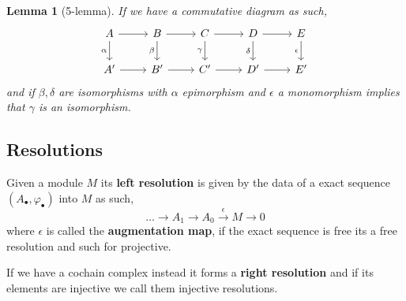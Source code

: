 \documentclass[12pt]{article}
\numberwithin{equation}{section}
\newcounter{dummy} \numberwithin{dummy}{section}
\newtheorem{lemma}[dummy]{Lemma}
\begin{document}
	\begin{lemma}[5-lemma]
		If we have a commutative diagram as such,
		\[\begin{tikzcd}
			A & B & C & D & E \\
			{A'} & {B'} & {C'} & {D'} & {E'}
			\arrow[from=1-1, to=1-2]
			\arrow["\alpha"', from=1-1, to=2-1]
			\arrow[from=1-2, to=1-3]
			\arrow["\beta"', from=1-2, to=2-2]
			\arrow[from=1-3, to=1-4]
			\arrow["\gamma"', from=1-3, to=2-3]
			\arrow[from=1-4, to=1-5]
			\arrow["\delta"', from=1-4, to=2-4]
			\arrow["\epsilon"', from=1-5, to=2-5]
			\arrow[from=2-1, to=2-2]
			\arrow[from=2-2, to=2-3]
			\arrow[from=2-3, to=2-4]
			\arrow[from=2-4, to=2-5]
		\end{tikzcd}\]
		and if $\beta, \delta $ are isomorphisms with $\alpha $ epimorphism and $\epsilon $ a monomorphism implies that $\gamma $ is an isomorphism.
	\end{lemma}
	
	\subsection{Resolutions}
	Given a module $M$ its \textbf{left resolution} is given by the data of a exact sequence $(A_\bullet, \varphi_\bullet)$ into $M$ as such,
	\[ 	\dots \to A_1	\to A_0 \xrightarrow{\epsilon} M \to 0 \]
	where $\epsilon $ is called the \textbf{augmentation map}, if the exact sequence is free its a free resolution and such for projective. 
	
	If we have a cochain complex instead it forms a \textbf{right resolution} and if its elements are injective we call them injective resolutions.
	
\end{document}

